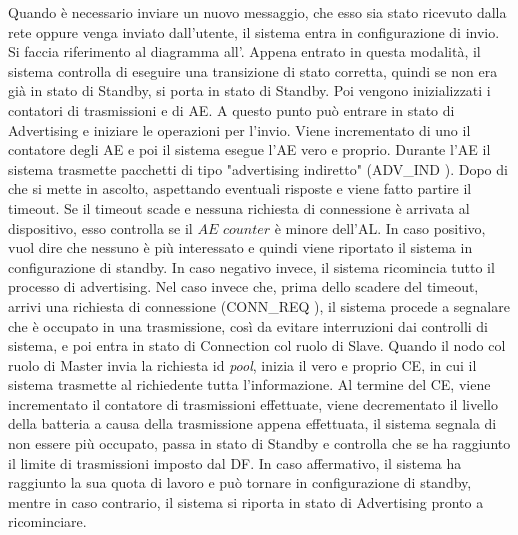 
Quando è necessario inviare un nuovo messaggio, che esso sia stato ricevuto dalla rete oppure venga inviato dall'utente, il sistema entra in configurazione di invio. Si faccia riferimento al diagramma all'. Appena entrato in questa modalità, il sistema controlla di eseguire una transizione di stato corretta, quindi se non era già in stato di Standby, si porta in stato di Standby. Poi vengono inizializzati i contatori di trasmissioni e di \acs{AE}. A questo punto può entrare in stato di Advertising e iniziare le operazioni per l'invio. Viene incrementato di uno il contatore degli AE e poi il sistema esegue l'\acs{AE} vero e proprio. Durante l'\acs{AE} il sistema trasmette pacchetti di tipo "advertising indiretto" (ADV\_IND \cite{BT-CoreSpec4.0}). Dopo di che si mette in ascolto, aspettando eventuali risposte e viene fatto partire il timeout. Se il timeout scade e nessuna richiesta di connessione è arrivata al dispositivo, esso controlla se il $\textit{AE counter}$ è minore dell'AL. In caso positivo, vuol dire che nessuno è più interessato e quindi viene riportato il sistema in configurazione di standby. In caso negativo invece, il sistema ricomincia tutto il processo di advertising. Nel caso invece che, prima dello scadere del timeout, arrivi una richiesta di connessione (CONN\_REQ \cite{BT-CoreSpec4.0}), il sistema procede a segnalare che è occupato in una trasmissione, così da evitare interruzioni dai controlli di sistema, e poi entra in stato di Connection col ruolo di Slave. Quando il nodo col ruolo di Master invia la richiesta id \textit{pool}, inizia il vero e proprio \acf{CE}, in cui il sistema trasmette al richiedente tutta l'informazione. Al termine del \acs{CE}, viene incrementato il contatore di trasmissioni effettuate, viene decrementato il livello della batteria a causa della trasmissione appena effettuata, il sistema segnala di non essere più occupato, passa in stato di Standby e controlla che se ha raggiunto il limite di trasmissioni imposto dal DF. In caso affermativo, il sistema ha raggiunto la sua quota di lavoro e può tornare in configurazione di standby, mentre in caso contrario, il sistema si riporta in stato di Advertising pronto a ricominciare.
\bigskip


